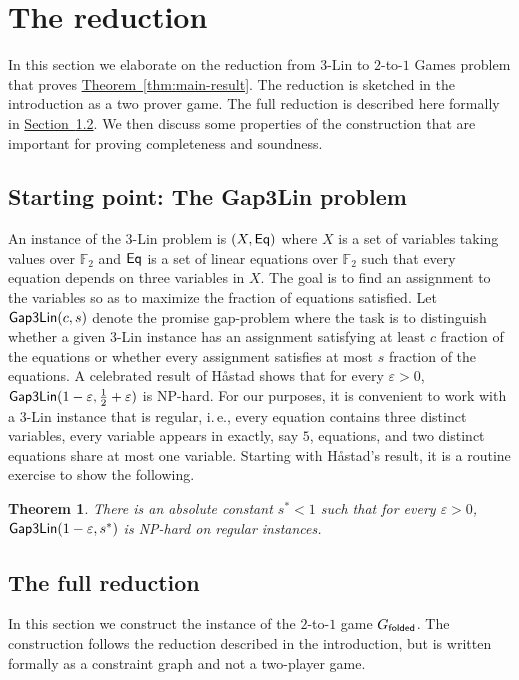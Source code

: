 \documentclass[11pt]{article}
\numberwithin{equation}{section}
\newtheorem{theorem}{Theorem}[section]
\theoremstyle{definition}
\theoremstyle{plain}
\newcommand{\ie}{i.\,e.}
\newcommand{\expref}[2]{\hyperref[#2]{#1~\ref{#2}}}
\newcommand\eps{\varepsilon}
\begin{document}
\section{The reduction}



In this section we elaborate on the reduction from $3$-Lin to $2$-to-$1$ Games problem that proves \expref{Theorem}{thm:main-result}. The reduction is sketched in the introduction as a two prover game. The full reduction is described here formally in \expref{Section}{sec:reduction}.
%
We then discuss some properties of the construction that are important for proving completeness and soundness.
%
\subsection{Starting point: The {\sf Gap3Lin} problem}

An instance of the $3$-Lin problem is
$(X, {\sf Eq})$ where $X$ is a set of variables taking values over ${\mathbb F}_2$ and ${\sf Eq}$ is a set of linear equations over
${\mathbb F}_2$ such that every equation depends on three variables in $X$. The goal is to find an assignment to the variables
so as to maximize the fraction of equations satisfied. Let ${\sf Gap3Lin}(c, s)$ denote the promise gap-problem
where the task is to distinguish whether a given $3$-Lin instance has an assignment satisfying at least $c$ fraction of
the equations or whether every assignment satisfies at most $s$ fraction of the equations.
A celebrated result of H\aa stad \cite{Has01} shows that for
%
every $\eps>0$, %
 ${\sf Gap3Lin}(1-\eps, \frac{1}{2}+\eps)$ is NP-hard. For our purposes, it is convenient to work with a $3$-Lin
 instance that is regular, \ie, every equation contains three distinct variables,  every variable appears in exactly, say $5$,
 equations, and two distinct equations share at most one variable.
 Starting with H{\aa}stad's result, it is a routine exercise to show
the following.  %

 \begin{theorem}\label{thm:3lin}  There is an absolute constant $s^* < 1$ such that for every %
 $\eps > 0$,
 ${\sf Gap3Lin}(1-\eps, s^*)$ is NP-hard on regular instances.
 \end{theorem}

\subsection{The full reduction}\label{sec:reduction}
\def\gnf{G_{\sf unfolded}}
\def\gf{G_{\sf folded}}
In this section we construct the instance of the $2$-to-$1$ game $\gf$. The construction follows the reduction described in the introduction, but is written formally as a constraint graph and not a two-player game.
\end{document}
